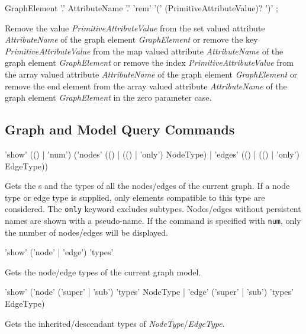 \begin{rail}
  GraphElement '.' AttributeName '.' 'rem' '(' (PrimitiveAttributeValue)? ')' ;
\end{rail}
Remove the value \emph{PrimitiveAttributeValue} from the set valued attribute \emph{AttributeName} of the graph element \emph{GraphElement} or remove the key \emph{PrimitiveAttributeValue} from the map valued attribute \emph{AttributeName} of the graph element \emph{GraphElement} or remove the index \emph{PrimitiveAttributeValue} from the array valued attribute \emph{AttributeName} of the graph element \emph{GraphElement} or remove the end element from the array valued attribute \emph{AttributeName} of the graph element \emph{GraphElement} in the zero parameter case.
  
\subsection{Graph and Model Query Commands}

\begin{rail}
  'show' (() | 'num') ('nodes' (() | (() | 'only') NodeType) | 'edges' (() | (() | 'only') EdgeType))
\end{rail}
Gets the s and the types of all the nodes/edges of the current graph. 
If a node type or edge type is supplied, only elements compatible to this type are considered. 
The \texttt{only} keyword excludes subtypes. Nodes/edges without persistent names are shown with a pseudo-name.
If the command is specified with \texttt{num}, only the number of nodes/edges will be displayed.

\begin{rail}
  'show' ('node' | 'edge') 'types'
\end{rail}
Gets the node/edge types of the current graph model.

\begin{rail}
'show' ('node' ('super' | 'sub') 'types' NodeType | 'edge' ('super' | 'sub') 'types' EdgeType)
\end{rail}
Gets the inherited/descendant types of \emph{NodeType}/\emph{EdgeType}.

